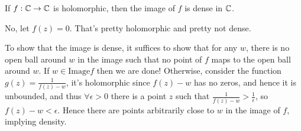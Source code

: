 \documentclass{homework}
\begin{document}
                                                                                                                                                                                                                                                                                \begin{problem}\label{entire-is-dense}If $f : \mathbb{C} \to \mathbb{C}$ is
                                                                                                                                                                                                                                                                                  holomorphic, then the image of $f$ is dense in $\mathbb{C}$.
                                                                                                                                                                                                                                                                                  \end{problem}
                                                                                                                                                                                                                                                                                  \begin{solution}
                                                                                                                                                                                                                                                                                  No, let $f(z)=0$. That's pretty holomorphic and pretty not dense. 

                                                                                                                                                                                                                                                                                  To show that the image is dense, it suffices to show that for any $w$, there is no open ball around $w$ in the image such that no point of $f$ maps to the open ball around $w$. If $w\in \text{Image} f$ then we are done! Otherwise, consider the function $g(z) =\frac{1}{f(z) - w}$, it's holomorphic since $f(z) - w$ has no zeros, and hence it is unbounded, and thus $\forall \epsilon > 0$ there is a point $z$ such that $\frac{1}{f(z) - w} > \frac{1}{\epsilon}$, so $f(z) - w < \epsilon$. Hence there are points arbitrarily close to $w$ in the image of $f$, implying density.
                                                                                                                                                                                                                                                                                  \end{solution}
\end{document}
